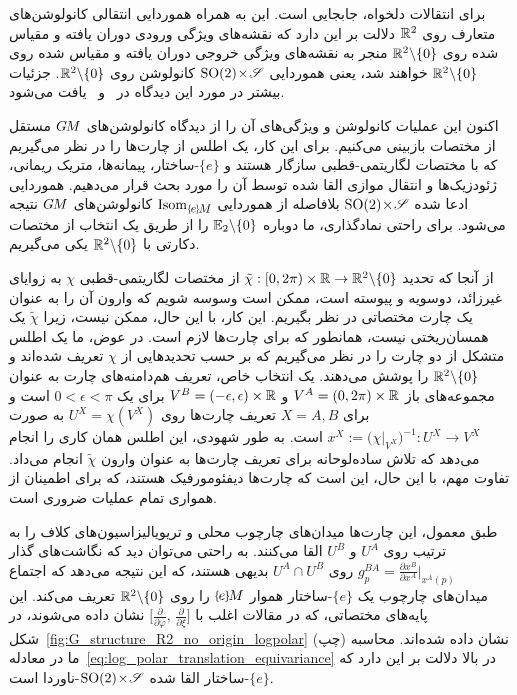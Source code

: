 برای انتقالات دلخواه، جابجایی است.
این به همراه هموردایی انتقالی کانولوشن‌های متعارف روی $\mathbb{R}^2$ دلالت بر این دارد که نقشه‌های ویژگی ورودی دوران یافته و مقیاس شده روی $\mathbb{R}^2 \backslash \{0\}$ منجر به نقشه‌های ویژگی خروجی دوران یافته و مقیاس شده روی $\mathbb{R}^2 \backslash \{0\}$ خواهند شد، یعنی هموردایی ${\operatorname{SO}(2) \!\times\! \mathscr{S}}$ کانولوشن روی $\mathbb{R}^2 \backslash \{0\}$.
جزئیات بیشتر در مورد این دیدگاه در~\cite{esteves2017polar} و~\cite{blatt1994canonical} یافت می‌شود.

اکنون این عملیات کانولوشن و ویژگی‌های آن را از دیدگاه کانولوشن‌های $G\mkern-1.4muM$ مستقل از مختصات بازبینی می‌کنیم.
برای این کار، یک اطلس از چارت‌ها را در نظر می‌گیریم که با مختصات لگاریتمی-قطبی سازگار هستند و $\{e\}$-ساختار، پیمانه‌ها، متریک ریمانی، ژئودزیک‌ها و انتقال موازی القا شده توسط آن را مورد بحث قرار می‌دهیم.
هموردایی ادعا شده ${\operatorname{SO}(2) \!\times\! \mathscr{S}}$ بلافاصله از هموردایی $\IsomeM$ کانولوشن‌های $G\mkern-1.4muM$ نتیجه می‌شود.
برای راحتی نمادگذاری، ما دوباره $\mathbb{E}_2 \backslash \{0\}$ را از طریق یک انتخاب از مختصات دکارتی با $\mathbb{R}^2 \backslash \{0\}$ یکی می‌گیریم.

از آنجا که تحدید $\tilde{\chi}: [0,2\pi) \times \mathbb{R} \to \mathbb{R}^2 \backslash \{0\}$ از مختصات لگاریتمی-قطبی $\chi$ به زوایای غیرزائد، دوسویه و پیوسته است، ممکن است وسوسه شویم که وارون آن را به عنوان یک چارت مختصاتی در نظر بگیریم.
این کار، با این حال، ممکن نیست، زیرا $\tilde{\chi}$ یک همسان‌ریختی نیست، همانطور که برای چارت‌ها لازم است.
در عوض، ما یک اطلس متشکل از دو چارت را در نظر می‌گیریم که بر حسب تحدیدهایی از $\chi$ تعریف شده‌اند و $\mathbb{R}^2 \backslash \{0\}$ را پوشش می‌دهند.
یک انتخاب خاص، تعریف هم‌دامنه‌های چارت به عنوان مجموعه‌های باز $V^A = (0,2\pi) \times \mathbb{R}$ و $V^B = (-\epsilon,\epsilon) \times \mathbb{R}$ برای یک $0< \epsilon <\pi$ است و برای $X=A,B$ تعریف چارت‌ها روی $U^X = \chi(V^X)$ به صورت $x^X := \big( \chi\big|_{V^X} \big)^{-1} : U^X \to V^X$ است.
به طور شهودی، این اطلس همان کاری را انجام می‌دهد که تلاش ساده‌لوحانه برای تعریف چارت‌ها به عنوان وارون $\tilde{\chi}$ انجام می‌داد.
تفاوت مهم، با این حال، این است که چارت‌ها دیفئومورفیک هستند، که برای اطمینان از همواری تمام عملیات ضروری است.

طبق معمول، این چارت‌ها میدان‌های چارچوب محلی و تریویالیزاسیون‌های کلاف را به ترتیب روی $U^A$ و $U^B$ القا می‌کنند.
به راحتی می‌توان دید که نگاشت‌های گذار $g_p^{BA} = \frac{\partial x^B}{\partial x^A} |_{x^A(p)}$ روی $U^A \cap U^B$ بدیهی هستند، که این نتیجه می‌دهد که اجتماع میدان‌های چارچوب یک $\{e\}$-ساختار هموار $\eM$ را روی $\mathbb{R}^2 \backslash \{0\}$ تعریف می‌کند.
این پایه‌های مختصاتی، که در مقالات اغلب با $\big[ \frac{\partial}{\partial \varphi} ,\, \frac{\partial}{\partial \xi} \big]$ نشان داده می‌شوند، در شکل~\ref{fig:G_structure_R2_no_origin_logpolar} (چپ) نشان داده شده‌اند.
محاسبه ما در معادله~\eqref{eq:log_polar_translation_equivariance} در بالا دلالت بر این دارد که $\{e\}$-ساختار القا شده ${\operatorname{SO}(2) \!\times\! \mathscr{S}}$-ناوردا است.

